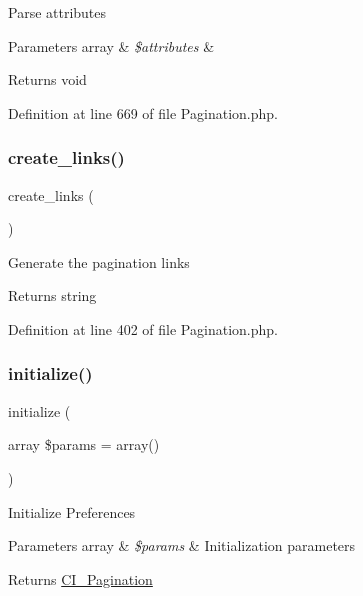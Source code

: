 Parse attributes


\begin{DoxyParams}[1]{Parameters}
array & {\em \$attributes} & \\
\hline
\end{DoxyParams}
\begin{DoxyReturn}{Returns}
void 
\end{DoxyReturn}


Definition at line 669 of file Pagination.\+php.

\mbox{\label{class_c_i___pagination_afd580f4d296b1d416d2b4b03edef3bc5}} 
\subsubsection{\texorpdfstring{create\_links()}{create\_links()}}
{\footnotesize\ttfamily create\+\_\+links (\begin{DoxyParamCaption}{ }\end{DoxyParamCaption})}

Generate the pagination links

\begin{DoxyReturn}{Returns}
string 
\end{DoxyReturn}


Definition at line 402 of file Pagination.\+php.

\mbox{\label{class_c_i___pagination_a37ac2c18c8af8852be6947397aa92275}} 
\subsubsection{\texorpdfstring{initialize()}{initialize()}}
{\footnotesize\ttfamily initialize (\begin{DoxyParamCaption}\item[{array}]{\$params = {\ttfamily array()} }\end{DoxyParamCaption})}

Initialize Preferences


\begin{DoxyParams}[1]{Parameters}
array & {\em \$params} & Initialization parameters \\
\hline
\end{DoxyParams}
\begin{DoxyReturn}{Returns}
\mbox{\hyperlink{class_c_i___pagination}{C\+I\+\_\+\+Pagination}} 
\end{DoxyReturn}


